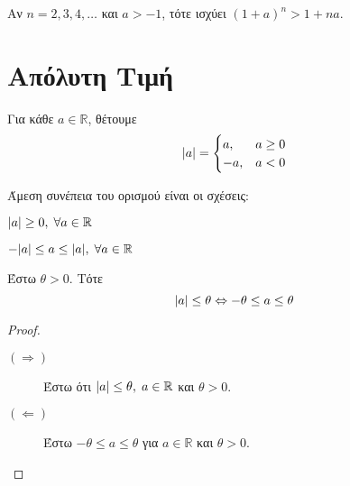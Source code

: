 \documentclass[main.tex]{subfiles}
\begin{document}
\begin{rem}
  Αν $ n=2,3,4,\ldots $ και $ a>-1 $, τότε ισχύει $ (1+a)^{n}>1+na $.
\end{rem}

\section{Απόλυτη Τιμή}

\begin{dfn}
  Για κάθε $ a \in \mathbb{R} $, θέτουμε
  \[ \abs{a} = \begin{cases} a, & a \geq 0 \\ -a, & a < 0 \end{cases}  \]
\end{dfn}

\begin{rem}
  Άμεση συνέπεια του ορισμού είναι οι σχέσεις:
  \begin{myitemize}
    \item $ \abs{a} \geq 0, \;  \forall a \in \mathbb{R} $
    \item $ -\abs{a} \leq a \leq \abs{a}, \; \forall a \in \mathbb{R} $
  \end{myitemize}
\end{rem}

\begin{mypropbox}
  \label{prop:absprop1}
  Έστω $ \theta > 0 $. Τότε 
  \[
    \abs{a} \leq \theta \Leftrightarrow - \theta \leq a \leq \theta  
  \]
\end{mypropbox}
\begin{proof}
\item {}
  \begin{description}
    \item [$(  \Rightarrow ) $] 
      Έστω ότι $ \abs{a} \leq \theta, \; a \in \mathbb{R} $ και 
      $ \theta >0 $. 
    \item [$(\Leftarrow)$] Έστω $ - \theta \leq a \leq \theta $ 
      για $ a \in \mathbb{R} $ και $ \theta >0 $.
  \end{description}
\end{proof}
\end{document}

